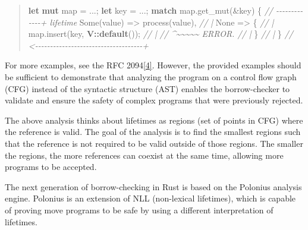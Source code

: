 \documentclass[
  11pt,
  twoside,symmetric]{report}
\newenvironment{Shaded}{}{}
\newcommand{\CommentTok}[1]{\textit{#1}}
\newcommand{\ConstantTok}[1]{#1}
\newcommand{\ControlFlowTok}[1]{\textbf{#1}}
\newcommand{\KeywordTok}[1]{\textbf{#1}}
\newcommand{\NormalTok}[1]{#1}
\newcommand{\OperatorTok}[1]{#1}
\newcommand{\PreprocessorTok}[1]{\textbf{#1}}
\begin{document}
\begin{quote}
\begin{Shaded}
\begin{Highlighting}[]
\KeywordTok{let} \KeywordTok{mut}\NormalTok{ map }\OperatorTok{=} \OperatorTok{...;}
\KeywordTok{let}\NormalTok{ key }\OperatorTok{=} \OperatorTok{...;}
\ControlFlowTok{match}\NormalTok{ map}\OperatorTok{.}\NormalTok{get\_mut(}\OperatorTok{\&}\NormalTok{key) }\OperatorTok{\{} \CommentTok{// {-}{-}{-}{-}{-}{-}{-}{-}{-}{-}{-}{-}{-}+ \textquotesingle{}lifetime}
    \ConstantTok{Some}\NormalTok{(value) }\OperatorTok{=\textgreater{}}\NormalTok{ process(value)}\OperatorTok{,}     \CommentTok{// |}
    \ConstantTok{None} \OperatorTok{=\textgreater{}} \OperatorTok{\{}                          \CommentTok{// |}
\NormalTok{        map}\OperatorTok{.}\NormalTok{insert(key}\OperatorTok{,} \PreprocessorTok{V::}\KeywordTok{default}\NormalTok{())}\OperatorTok{;} \CommentTok{// |}
        \CommentTok{//  \^{}\textasciitilde{}\textasciitilde{}\textasciitilde{}\textasciitilde{}\textasciitilde{} ERROR.              // |}
    \OperatorTok{\}}                                  \CommentTok{// |}
\OperatorTok{\}} \CommentTok{// \textless{}{-}{-}{-}{-}{-}{-}{-}{-}{-}{-}{-}{-}{-}{-}{-}{-}{-}{-}{-}{-}{-}{-}{-}{-}{-}{-}{-}{-}{-}{-}{-}{-}{-}{-}{-}{-}+}
\end{Highlighting}
\end{Shaded}
\end{quote}

For more examples, see the RFC
2094\protect\hyperlink{ref-rfc2094nll}{{[}4{]}}. However, the provided
examples should be sufficient to demonstrate that analyzing the program
on a control flow graph (CFG) instead of the syntactic structure (AST)
enables the borrow-checker to validate and ensure the safety of complex
programs that were previously rejected.

The above analysis thinks about lifetimes as regions (set of points in
CFG) where the reference is valid. The goal of the analysis is to find
the smallest regions such that the reference is not required to be valid
outside of those regions. The smaller the regions, the more references
can coexist at the same time, allowing more programs to be accepted.

The next generation of borrow-checking in Rust is based on the Polonius
analysis engine. Polonius is an extension of NLL (non-lexical
lifetimes), which is capable of proving move programs to be safe by
using a different interpretation of lifetimes.
\end{document}
